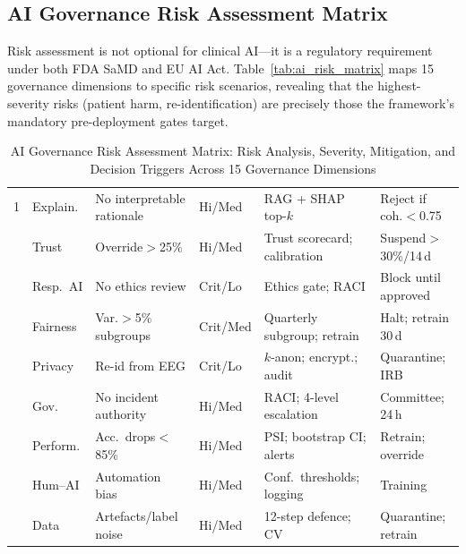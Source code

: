 \subsection{AI Governance Risk Assessment Matrix}

Risk assessment is not optional for clinical AI---it is a regulatory requirement under both FDA SaMD and EU AI Act. Table~\ref{tab:ai_risk_matrix} maps 15 governance dimensions to specific risk scenarios, revealing that the highest-severity risks (patient harm, re-identification) are precisely those the framework's mandatory pre-deployment gates target.

\iffalse
\begin{table}[!htbp]
\tablestripes
\tablefontsize
\caption[AI Governance Risk Assessment Matrix]{AI Governance Risk Assessment Matrix: Risk Analysis, Severity, Mitigation, and Decision Triggers Across 15 Governance Dimensions}
\begin{tabularx}{\textwidth}{@{} p{0.4cm} >{\raggedright\arraybackslash}p{1.8cm} L >{\raggedright\arraybackslash}p{1.3cm} L L @{}}
\toprule
\thead{\#} &  &  &  &  &  \\
 & Explain. & No interpretable rationale & Hi/Med & RAG + SHAP top-$k$ & Reject if coh.$<$0.75 \\
 & Trust & Override$>$25\% & Hi/Med & Trust scorecard; calibration & Suspend$>$30\%/14\,d \\
 & Resp.\ AI & No ethics review & Crit/Lo & Ethics gate; RACI & Block until approved \\
 & Fairness & Var.$>$5\% subgroups & Crit/Med & Quarterly subgroup; retrain & Halt; retrain 30\,d \\
 & Privacy & Re-id from EEG & Crit/Lo & $k$-anon; encrypt.; audit & Quarantine; IRB \\
 & Gov. & No incident authority & Hi/Med & RACI; 4-level escalation & Committee; 24\,h \\
 & Perform. & Acc.\ drops$<$85\% & Hi/Med & PSI; bootstrap CI; alerts & Retrain; override \\
 & Hum--AI & Automation bias & Hi/Med & Conf.\ thresholds; logging & Training \\
 & Data & Artefacts/label noise & Hi/Med & 12-step defence; CV & Quarantine; retrain \\

\end{tabularx}
\end{table}
